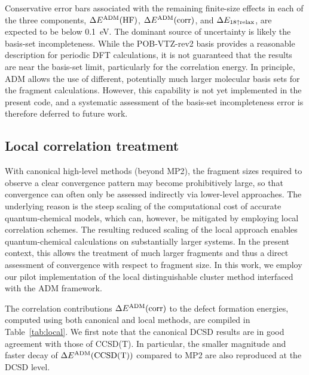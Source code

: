 \documentclass[aip,jcp,reprint]{revtex4-2}
\begin{document}
Conservative error bars associated with the remaining finite-size effects in each of the three components, $\Delta E^{\rm ADM}({\rm HF})$, $\Delta E^{\rm ADM}({\rm corr})$, and $\Delta E_{\rm 18\uparrow \rm relax}$, are expected to be below 0.1~eV. The dominant source of uncertainty is likely the basis-set incompleteness. While the POB-VTZ-rev2 basis provides a reasonable description for periodic DFT calculations, it is not guaranteed that the results are near the basis-set limit,\cite{TS_embedding} particularly for the correlation energy. In principle, ADM allows the use of different, potentially much larger molecular basis sets for the fragment calculations. However, this capability is not yet implemented in the present code, and a systematic assessment of the basis-set incompleteness error is therefore deferred to future work.


\subsection{Local correlation treatment}



With canonical high-level methods (beyond MP2), the fragment sizes required to observe a clear convergence pattern may become prohibitively large, so that convergence can often only be assessed indirectly via lower-level approaches. The underlying reason is the steep scaling of the computational cost of accurate quantum-chemical models, which can, however, be mitigated by employing local correlation schemes.\cite{Schuetz2001_LCCSD} The resulting reduced scaling of the local approach enables quantum-chemical calculations on substantially larger systems. In the present context, this allows the treatment of much larger fragments and thus a direct assessment of convergence with respect to fragment size. In this work, we employ our pilot implementation of the local distinguishable cluster method interfaced with the ADM framework.

The correlation contributions $\Delta E^{\rm ADM}({\rm corr})$ to the defect formation energies, computed using both canonical and local methods, are compiled in Table~\ref{tab:local}. We first note that the canonical DCSD results are in good agreement with those of CCSD(T). In particular, the smaller magnitude and faster decay of $\Delta E^{\rm ADM}({\rm CCSD(T)})$ compared to MP2 are also reproduced at the DCSD level.
\end{document}
